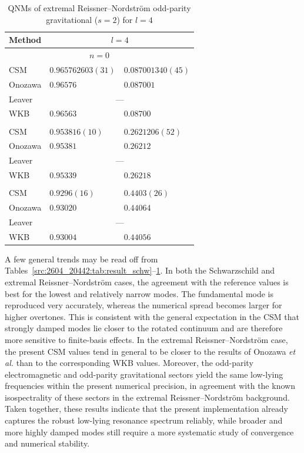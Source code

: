 \begin{table}[htbp]
\centering
\caption{QNMs of extremal Reissner--Nordstr\"om odd-parity gravitational ($s=2$) for $l=4$}
\label{src:2604_20442:tab:result_rn2_2}
\begin{tabular}{l
                l@{$-\rmi$}l}
\toprule
Method & \multicolumn{2}{c}{$l=4$} \\
\midrule
\multicolumn{3}{c}{$n=0$} \\
CSM     & $0.965762603(31)$ & $0.087001340(45)$ \\
Onozawa & $0.96576$     & $0.087001$ \\
Leaver  & \multicolumn{2}{c}{---} \\
WKB     & $0.96563$     & $0.08700$ \\
\addlinespace
\multicolumn{3}{c}{$n=1$} \\
CSM     & $0.953816(10)$ & $0.2621206(52)$ \\
Onozawa & $0.95381$   & $0.26212$ \\
Leaver  & \multicolumn{2}{c}{---} \\
WKB     & $0.95339$   & $0.26218$ \\
\addlinespace
\multicolumn{3}{c}{$n=2$} \\
CSM     & $0.9296(16)$ & $0.4403(26)$ \\
Onozawa & $0.93020$    & $0.44064$ \\
Leaver  & \multicolumn{2}{c}{---} \\
WKB     & $0.93004$    & $0.44056$ \\
\bottomrule
\end{tabular}
\end{table}
A few general trends may be read off from Tables~\ref{src:2604_20442:tab:result_schw}--\ref{src:2604_20442:tab:result_rn2_2}.
In both the Schwarzschild and extremal Reissner--Nordstr\"om cases, the agreement with the reference values is best for the lowest and relatively narrow modes.
The fundamental mode is reproduced very accurately, whereas the numerical spread becomes larger for higher overtones.
This is consistent with the general expectation in the CSM that strongly damped modes lie closer to the rotated continuum and are therefore more sensitive to finite-basis effects.
In the extremal Reissner--Nordstr\"om case, the present CSM values tend in general to be closer to the results of Onozawa \textit{et al.\/} than to the corresponding WKB values.
Moreover, the odd-parity electromagnetic and odd-parity gravitational sectors yield the same low-lying frequencies within the present numerical precision, in agreement with the known isospectrality of these sectors in the extremal Reissner--Nordstr\"om background.
Taken together, these results indicate that the present implementation already captures the robust low-lying resonance spectrum reliably, while broader and more highly damped modes still require a more systematic study of convergence and numerical stability.
